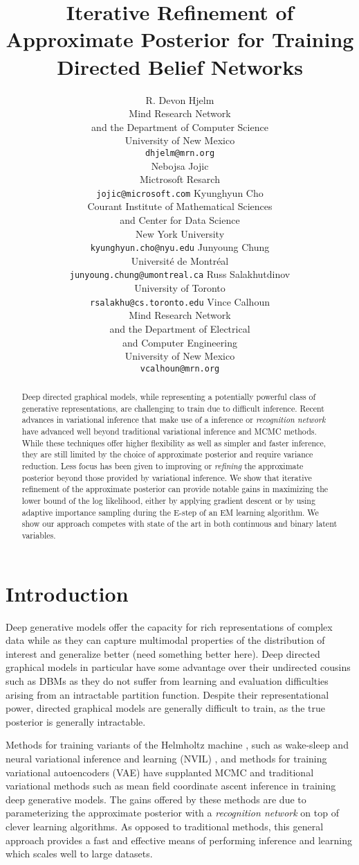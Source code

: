 \documentclass{article} %
\title{Iterative Refinement of Approximate Posterior for Training Directed Belief Networks}
\author{R. Devon Hjelm \\
Mind Research Network \\
and the Department of Computer Science \\
University of New Mexico \\
\texttt{dhjelm@mrn.org} \\
\And
Nebojsa Jojic \\
Mictrosoft Resarch \\
\texttt{jojic@microsoft.com}
\And
Kyunghyun Cho \\
Courant Institute of Mathematical Sciences \\ 
and Center for Data Science \\
New York University \\
\texttt{kyunghyun.cho@nyu.edu}
\And
Junyoung Chung \\
Universit\'{e} de Montr\'{e}al \\
\texttt{junyoung.chung@umontreal.ca}
\And
Russ Salakhutdinov \\
University of Toronto \\
\texttt{rsalakhu@cs.toronto.edu}
\And
Vince Calhoun \\
Mind Research Network \\
and the Department of Electrical \\ 
and Computer Engineering \\
University of New Mexico \\
\texttt{vcalhoun@mrn.org}
}
\begin{document}
\maketitle

\begin{abstract}
    Deep directed graphical models, while representing a potentially powerful class of generative representations, are challenging to train due to difficult inference. Recent advances in variational inference that make use of a inference or \emph{recognition network} have advanced well beyond traditional variational inference and MCMC methods. While these techniques offer higher flexibility as well as simpler and faster inference, they are still limited by the choice of approximate posterior and require variance reduction. Less focus has been given to improving or \emph{refining} the approximate posterior beyond those provided by variational inference. We show that iterative refinement of the approximate posterior can provide notable gains in maximizing the lower bound of the log likelihood, either by applying gradient descent or by using adaptive importance sampling during the E-step of an EM learning algorithm. We show our approach competes with state of the art in both continuous and binary latent variables.
    \end{abstract}

\section{Introduction}

Deep generative models offer the capacity for rich representations of complex data while as they can capture multimodal properties of the distribution of interest and generalize better (need something better here). Deep directed graphical models in particular have some advantage over their undirected cousins such as DBMs \citep{salakhutdinov2009deep} as they do not suffer from learning and evaluation difficulties arising from an intractable partition function. Despite their representational power, directed graphical models are generally difficult to train, as the true posterior is generally intractable.

Methods for training variants of the Helmholtz machine \citep{dayan1995helmholtz}, such as wake-sleep \citep{hinton1995wake, bornschein2014reweighted} and neural variational inference and learning (NVIL) \citep{mnih2014neural}, and methods for training variational autoencoders (VAE) \citep{kingma2013auto} have supplanted MCMC and traditional variational methods such as mean field coordinate ascent inference in training deep generative models. The gains offered by these methods are due to parameterizing the approximate posterior with a \emph{recognition network} on top of clever learning algorithms. As opposed to traditional methods, this general approach provides a fast and effective means of performing inference and learning which scales well to large datasets.
\end{document}
